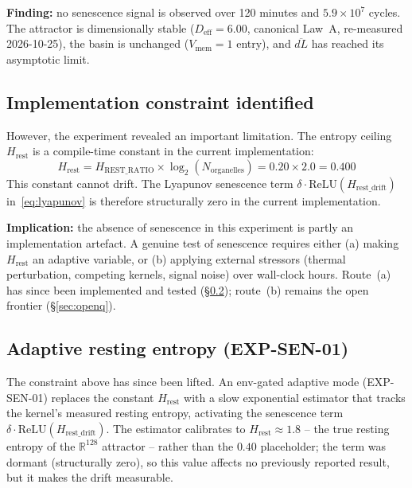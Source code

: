 \documentclass[11pt, a4paper]{article}
\newcommand{\R}{\mathbb{R}}
\begin{document}
\textbf{Finding:} no senescence signal is observed over 120 minutes and
$5.9 \times 10^7$ cycles.
The attractor is dimensionally stable ($D_\text{eff} = 6.00$, canonical Law~A,
re-measured 2026-10-25), the basin is
unchanged ($V_\text{mem} = 1$ entry), and $\overline{dL}$ has reached its
asymptotic limit.

\subsection{Implementation constraint identified}

However, the experiment revealed an important limitation.
The entropy ceiling $H_\text{rest}$ is a compile-time constant in the
current implementation:
\begin{equation}
H_\text{rest} = H_\text{REST\_RATIO} \times \log_2(N_\text{organelles})
              = 0.20 \times 2.0 = 0.400
\end{equation}
This constant cannot drift.
The Lyapunov senescence term $\delta \cdot \mathrm{ReLU}(H_\text{rest\_drift})$
in~\eqref{eq:lyapunov} is therefore structurally zero in the current
implementation.

\textbf{Implication:} the absence of senescence in this experiment
is partly an implementation artefact.
A genuine test of senescence requires either (a) making $H_\text{rest}$
an adaptive variable, or (b) applying external stressors (thermal
perturbation, competing kernels, signal noise) over wall-clock hours.
Route~(a) has since been implemented and tested
(\S\ref{sec:adaptive_hrest}); route~(b) remains the open frontier
(\S\ref{sec:openq}).

\subsection{Adaptive resting entropy (EXP-SEN-01)}
\label{sec:adaptive_hrest}

The constraint above has since been lifted. An env-gated adaptive mode
(EXP-SEN-01) replaces the constant $H_\text{rest}$ with a slow exponential
estimator that tracks the kernel's measured resting entropy, activating the
senescence term $\delta\cdot\mathrm{ReLU}(H_\text{rest\_drift})$. The estimator
calibrates to $H_\text{rest}\approx1.8$ -- the true resting entropy of the
$\R^{128}$ attractor -- rather than the $0.40$ placeholder; the term was dormant
(structurally zero), so this value affects no previously reported result, but it
makes the drift measurable.
\end{document}
